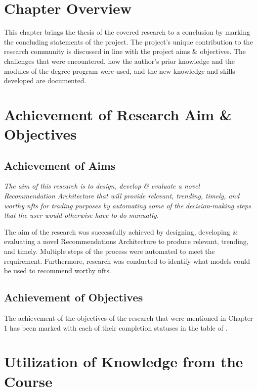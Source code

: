 \section{Chapter Overview}
This chapter brings the thesis of the covered research to a conclusion by marking the concluding statements of the project. The project's unique contribution to the research community is discussed in line with the project aims \& objectives. The challenges that were encountered, how the author's prior knowledge and the modules of the degree program were used, and the new knowledge and skills developed are documented.


\section{Achievement of Research Aim \& Objectives}

\subsection{Achievement of Aims}
\textit{The aim of this research is to design, develop \& evaluate a novel Recommendation Architecture that will provide relevant, trending, timely, and worthy \gls{nft}s for trading purposes by automating some of the decision-making steps that the user would otherwise have to do manually.}

The aim of the research was successfully achieved by designing, developing \& evaluating a novel Recommendations Architecture to produce relevant, trending, and timely. Multiple steps of the process were automated to meet the requirement. Furthermore, research was conducted to identify what models could be used to recommend worthy \gls{nft}s.

\subsection{Achievement of Objectives}
The achievement of the objectives of the research that were mentioned in Chapter 1 has been marked with each of their completion statuses in the  table of \textit{}.


\section{Utilization of Knowledge from the Course}


